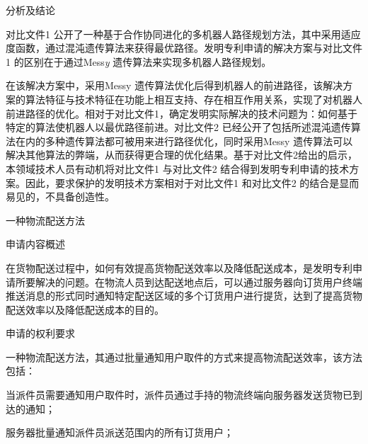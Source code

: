 {\setlength{\parindent}{20.1bp}分析及结论\par}

{\setlength{\parindent}{20.6bp}对比文件1 公开了一种基于合作协同进化的多机器人路径规划方法，其中采用适应度函数，通过混沌遗传算法来获得最优路径。发明专利申请的解决方案与对比文件1 的区别在于通过Mess\textit{y} 遗传算法来实现多机器人路径规划。\par}

{\setlength{\parindent}{20.6bp}在该解决方案中，采用Messy 遗传算法优化后得到机器人的前进路径，该解决方案的算法特征与技术特征在功能上相互支持、存在相互作用关系，实现了对机器人前进路径的优化。相对于对比文件1，确定发明实际解决的技术问题为：如何基于特定的算法使机器人以最优路径前进。对比文件2 已经公开了包括所述混沌遗传算法在内的多种遗传算法都可被用来进行路径优化，同时采用Messy 遗传算法可以解决其他算法的弊端，从而获得更合理的优化结果。基于对比文件2给出的启示，本领域技术人员有动机将对比文件1 与对比文件2 结合得到发明专利申请的技术方案。因此，要求保护的发明技术方案相对于对比文件1 和对比文件2 的结合是显而易见的，不具备创造性。\par}

{\setlength{\parindent}{15.3bp}\par}

{\setlength{\parindent}{20.6bp}一种物流配送方法\par}

{\setlength{\parindent}{20.1bp}申请内容概述\par}

{\setlength{\parindent}{20.6bp}在货物配送过程中，如何有效提高货物配送效率以及降低配送成本，是发明专利申请所要解决的问题。在物流人员到达配送地点后，可以通过服务器向订货用户终端推送消息的形式同时通知特定配送区域的多个订货用户进行提货，达到了提高货物配送效率以及降低配送成本的目的。\par}

{\setlength{\parindent}{20.1bp}申请的权利要求\par}

{\setlength{\parindent}{20.6bp}一种物流配送方法，其通过批量通知用户取件的方式来提高物流配送效率，该方法包括：\par}

{\setlength{\parindent}{20.6bp}当派件员需要通知用户取件时，派件员通过手持的物流终端向服务器发送货物已到达的通知；\par}

{\setlength{\parindent}{20.6bp}服务器批量通知派件员派送范围内的所有订货用户；\par}

